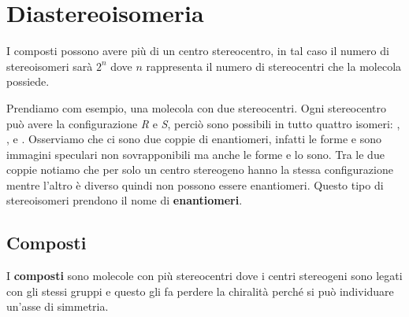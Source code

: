 \section{Diastereoisomeria}
I composti possono avere più di un centro stereocentro, in tal caso il numero di stereoisomeri sarà \(2^n\) dove \(n\) rappresenta il numero di stereocentri che la molecola possiede.

Prendiamo com esempio, una molecola con due stereocentri. Ogni stereocentro può avere la configurazione \textit{R} e \textit{S}, perciò sono possibili in tutto quattro isomeri: , , e . Osserviamo che ci sono due coppie di enantiomeri, infatti le forme  e  sono immagini speculari non sovrapponibili ma anche le forme  e  lo sono.
Tra le due coppie notiamo che per solo un centro stereogeno hanno la stessa configurazione mentre l'altro è diverso quindi non possono essere enantiomeri. Questo tipo di stereoisomeri prendono il nome di \textbf{enantiomeri}.

\subsection{Composti \texorpdfstring{\meso}{meso}}
I \textbf{composti \meso} sono molecole con più stereocentri dove i centri stereogeni sono legati con gli stessi gruppi e questo gli fa perdere la chiralità perché si può individuare un'asse di simmetria.

